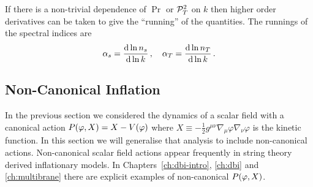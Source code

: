 If there is a non-trivial dependence of $\Pr$ or $\mathcal{P}_T^2$ on $k$ then higher order
derivatives can be taken to give the ``running'' of the quantities. The runnings
of the spectral indices are
% 
\begin{equation}
\label{eq:runningsdefn-intro}
 \alpha_s = \frac{\mathrm{d} \ln n_s}{\mathrm{d} \ln k}\,, \quad 
  \alpha_T = \frac{\mathrm{d} \ln n_T}{\mathrm{d} \ln k}\,.
\end{equation}

\subsection{Non-Canonical Inflation} 
\label{sec:noncanoninfl}

In the previous section we considered the dynamics of a scalar field with a
canonical action $P(\varphi, X) = X - V(\varphi)$ where $X \equiv -\frac{1}{2}g^{\mu
\nu}\nabla_\mu \varphi \nabla_\nu \varphi$ is the kinetic function. 
In this
section we will generalise
that analysis to include non-canonical actions. Non-canonical scalar
field actions appear frequently in string theory derived inflationary models.
In Chapters~\ref{ch:dbi-intro}, \ref{ch:dbi} and \ref{ch:multibrane}
there are explicit examples of non-canonical $P(\varphi,X)$.

